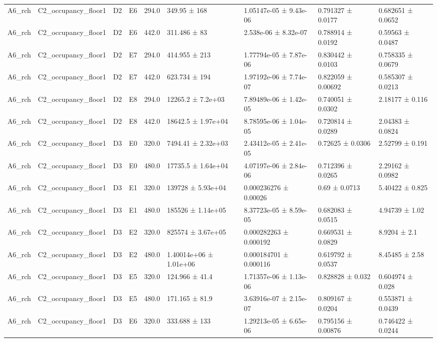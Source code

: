 \begin{table}
\begin{tabular}{lllllllll}
A6\_rch & C2\_occupancy\_floor1 & D2 & E6 & 294.0 & 349.95 ± 168 & 1.05147e-05 ± 9.43e-06 & 0.791327 ± 0.0177 & 0.682651 ± 0.0652 \\
A6\_rch & C2\_occupancy\_floor1 & D2 & E6 & 442.0 & 311.486 ± 83 & 2.538e-06 ± 8.32e-07 & 0.788914 ± 0.0192 & 0.59563 ± 0.0487 \\
A6\_rch & C2\_occupancy\_floor1 & D2 & E7 & 294.0 & 414.955 ± 213 & 1.77794e-05 ± 7.87e-06 & 0.830442 ± 0.0103 & 0.758335 ± 0.0679 \\
A6\_rch & C2\_occupancy\_floor1 & D2 & E7 & 442.0 & 623.734 ± 194 & 1.97192e-06 ± 7.74e-07 & 0.822059 ± 0.00692 & 0.585307 ± 0.0213 \\
A6\_rch & C2\_occupancy\_floor1 & D2 & E8 & 294.0 & 12265.2 ± 7.2e+03 & 7.89489e-06 ± 1.42e-05 & 0.740051 ± 0.0302 & 2.18177 ± 0.116 \\
A6\_rch & C2\_occupancy\_floor1 & D2 & E8 & 442.0 & 18642.5 ± 1.97e+04 & 8.78595e-06 ± 1.04e-05 & 0.720814 ± 0.0289 & 2.04383 ± 0.0824 \\
A6\_rch & C2\_occupancy\_floor1 & D3 & E0 & 320.0 & 7494.41 ± 2.32e+03 & 2.43412e-05 ± 2.41e-05 & 0.72625 ± 0.0306 & 2.52799 ± 0.191 \\
A6\_rch & C2\_occupancy\_floor1 & D3 & E0 & 480.0 & 17735.5 ± 1.64e+04 & 4.07197e-06 ± 2.84e-06 & 0.712396 ± 0.0265 & 2.29162 ± 0.0982 \\
A6\_rch & C2\_occupancy\_floor1 & D3 & E1 & 320.0 & 139728 ± 5.93e+04 & 0.000236276 ± 0.00026 & 0.69 ± 0.0713 & 5.40422 ± 0.825 \\
A6\_rch & C2\_occupancy\_floor1 & D3 & E1 & 480.0 & 185526 ± 1.14e+05 & 8.37723e-05 ± 8.59e-05 & 0.682083 ± 0.0515 & 4.94739 ± 1.02 \\
A6\_rch & C2\_occupancy\_floor1 & D3 & E2 & 320.0 & 825574 ± 3.67e+05 & 0.000282263 ± 0.000192 & 0.669531 ± 0.0829 & 8.9204 ± 2.1 \\
A6\_rch & C2\_occupancy\_floor1 & D3 & E2 & 480.0 & 1.40014e+06 ± 1.01e+06 & 0.000184701 ± 0.000116 & 0.619792 ± 0.0537 & 8.45485 ± 2.58 \\
A6\_rch & C2\_occupancy\_floor1 & D3 & E5 & 320.0 & 124.966 ± 41.4 & 1.71357e-06 ± 1.13e-06 & 0.828828 ± 0.032 & 0.604974 ± 0.028 \\
A6\_rch & C2\_occupancy\_floor1 & D3 & E5 & 480.0 & 171.165 ± 81.9 & 3.63916e-07 ± 2.15e-07 & 0.809167 ± 0.0204 & 0.553871 ± 0.0439 \\
A6\_rch & C2\_occupancy\_floor1 & D3 & E6 & 320.0 & 333.688 ± 133 & 1.29213e-05 ± 6.65e-06 & 0.795156 ± 0.00876 & 0.746422 ± 0.0244 \\

\end{tabular}
\end{table}
